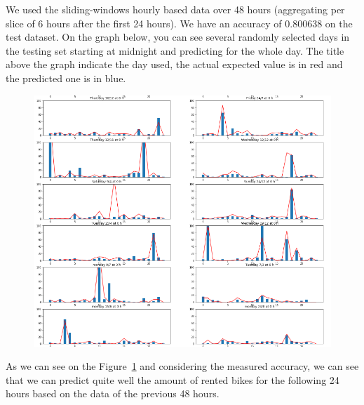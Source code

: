 We used the sliding-windows hourly based data over 48 hours (aggregating per slice
of 6 hours after the first 24 hours).
We have an accuracy of 0.800638 on the test dataset.
On the graph below, you can see several randomly selected days in the testing set
starting at midnight and predicting for the whole day. The title above the graph
indicate the day used, the actual expected value is in red and the predicted one
is in blue.
\begin{figure}[H]
\hspace{-0.9cm}
\includegraphics[width=1.1\textwidth]{img/hourly_predictions}
\label{fig:hourly_pred}
\end{figure}

As we can see on the Figure~\ref{fig:hourly_pred} and considering the measured accuracy, we can see that we can predict
quite well the amount of rented bikes for the following 24 hours based on the data of
the previous 48 hours.

